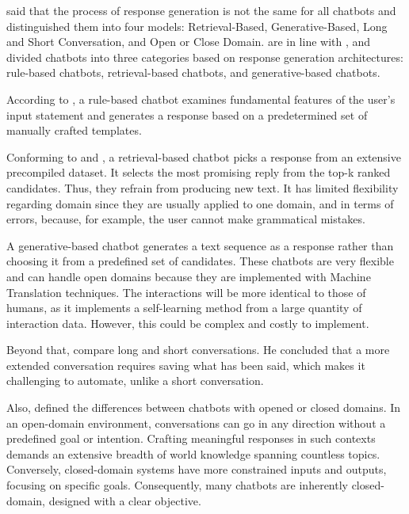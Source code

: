
\citet{borah_survey_2019} said that the process of response generation is not the same for all chatbots and distinguished them into four models: Retrieval-Based, Generative-Based, Long and Short Conversation, and Open or Close Domain. \citet{chizhik_challenges_2020} are in line with \citet{borah_survey_2019}, and divided chatbots into three categories based on response generation architectures: rule-based chatbots, retrieval-based chatbots, and generative-based chatbots.

According to \citet{chizhik_challenges_2020}, a rule-based chatbot examines fundamental features of the user's input statement and generates a response based on a predetermined set of manually crafted templates.

Conforming to \citet{chizhik_challenges_2020} and \citet{borah_survey_2019}, a retrieval-based chatbot picks a response from an extensive precompiled dataset. It selects the most promising reply from the top-k ranked candidates. Thus, they refrain from producing new text. It has limited flexibility regarding domain since they are usually applied to one domain, and in terms of errors, because, for example, the user cannot make grammatical mistakes.

A generative-based chatbot generates a text sequence as a response rather than choosing it from a predefined set of candidates. These chatbots are very flexible and can handle open domains because they are implemented with Machine Translation techniques. The interactions will be more identical to those of humans, as it implements a self-learning method from a large quantity of interaction data. However, this could be complex and costly to implement.

Beyond that, \citet{borah_survey_2019} compare long and short conversations. He concluded that a more extended conversation requires saving what has been said, which makes it challenging to automate, unlike a short conversation. 

Also, \citet{borah_survey_2019} defined the differences between chatbots with opened or closed domains. In an open-domain environment, conversations can go in any direction without a predefined goal or intention. Crafting meaningful responses in such contexts demands an extensive breadth of world knowledge spanning countless topics. Conversely, closed-domain systems have more constrained inputs and outputs, focusing on specific goals. Consequently, many chatbots are inherently closed-domain, designed with a clear objective.


